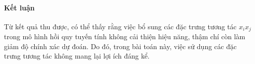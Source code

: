 \paragraph{Kết luận}

Từ kết quả thu được, có thể thấy rằng việc bổ sung các đặc trưng tương tác $x_i x_j$ trong mô hình hồi quy tuyến tính không cải thiện hiệu năng, thậm chí còn làm giảm độ chính xác dự đoán. Do đó, trong bài toán này, việc sử dụng các đặc trưng tương tác không mang lại lợi ích đáng kể.